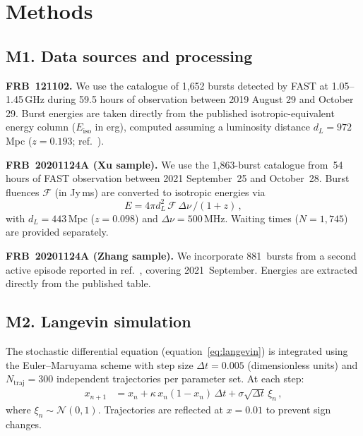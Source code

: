 
\section*{Methods}

\subsection*{M1. Data sources and processing}

\textbf{FRB~121102.} We use the catalogue of 1{,}652 bursts detected by FAST at 1.05--1.45\,GHz during 59.5 hours of observation between 2019 August 29 and October 29\cite{li2021}. Burst energies are taken directly from the published isotropic-equivalent energy column ($E_{\mathrm{iso}}$ in erg), computed assuming a luminosity distance $d_L = 972$\,Mpc ($z = 0.193$; ref.~).

\textbf{FRB~20201124A (Xu sample).} We use the 1{,}863-burst catalogue from~54 hours of FAST observation between 2021 September~25 and October~28\cite{xu2022}. Burst fluences $\mathcal{F}$ (in Jy\,ms) are converted to isotropic energies via
\begin{equation}
E = 4\pi d_L^2 \,\mathcal{F}\,\Delta\nu\,/(1+z)\,,
\tag{M1}
\label{eq:M1}
\end{equation}
with $d_L = 443$\,Mpc ($z = 0.098$) and $\Delta\nu = 500$\,MHz. Waiting times ($N = 1{,}745$) are provided separately.

\textbf{FRB~20201124A (Zhang sample).} We incorporate 881~bursts from a second active episode reported in ref.~, covering 2021~September. Energies are extracted directly from the published table.

\subsection*{M2. Langevin simulation}

The stochastic differential equation (equation~\ref{eq:langevin}) is integrated using the Euler--Maruyama scheme with step size $\Delta t = 0.005$ (dimensionless units) and $N_{\mathrm{traj}} = 300$ independent trajectories per parameter set. At each step:
\begin{align}
x_{n+1} &= x_n + \kappa\,x_n(1 - x_n)\,\Delta t + \sigma\sqrt{\Delta t}\,\xi_n\,,
\tag{M2}
\label{eq:M2}
\end{align}
where $\xi_n \sim \mathcal{N}(0,1)$. Trajectories are reflected at $x = 0.01$ to prevent sign changes.

